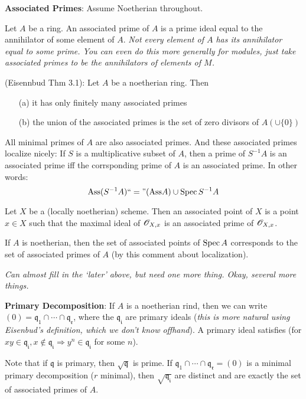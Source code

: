 \textbf{Associated Primes}: Assume Noetherian throughout.
\begin{definition} Let $A$ be a ring. An associated prime of $A$
is a prime ideal equal to the annihilator of some element of $A$.
\emph{Not every element of $A$ has its annihilator equal to some
prime. You can even do this more generally for modules, just take
associated primes to be the annihilators of elements of $M$.}
\end{definition} \begin{theorem}(Eisennbud Thm 3.1): Let $A$ be a
noetherian ring. Then \begin{itemize} \item[(a)] it has only
finitely many associated primes \item[(b)] the union of the
associated primes is the set of zero divisors of $A (\cup \{0\})$
\end{itemize} \end{theorem} \begin{remark} All minimal primes of
$A$ are also associated primes. And these associated primes
localize nicely: If $S$ is a multiplicative subset of $A$, then a
prime of $S^{-1}A$ is an associated prime iff the corrsponding
prime of $A$ is an associated prime. In other words: \[
\text{Ass}(S^{-1}A) ``=" (\text{Ass} A)\cup \text{\rm Spec\,}{S^{-1}A} \]
\end{remark} \begin{definition} Let $X$ be a (locally noetherian)
scheme. Then an associated point of $X$ is a point $x \in X$ such
that the maximal ideal of $\mathscr{O}_{X,x}$ is an associated prime of
$\mathscr{O}_{X,x}$.

If $A$ is noetherian, then the set of associated points of
$\text{\rm Spec\,}{A}$ corresponds to the set of associated primes of $A$ (by
this comment about localization). \end{definition}

\emph{Can almost fill in the `later' above, but need one more
thing.
Okay, several more things.}\\

\begin{proposition}\textbf{Primary Decomposition}: If $A$ is a
noetherian rind, then we can write $(0) = \mathfrak{q_1} \cap
\cdots \cap \mathfrak{q_r}$, where the $\mathfrak{q_i}$ are
primary ideals (\emph{this is more natural using Eisenbud's
definition, which we don't know offhand}). A primary ideal
satisfies (for $xy \in \mathfrak{q_i}, x \not \in \mathfrak{q_i}
\Rightarrow y^n \in \mathfrak{q_i}$ for some $n$).
\end{proposition} \begin{remark} Note that if $\mathfrak{q}$ is
primary, then $\sqrt{\mathfrak{q}}$ is prime. If $\mathfrak{q_1}
\cap \cdots \cap \mathfrak{q_r} = (0)$ is a minimal primary
decomposition ($r$ minimal), then $\sqrt{\mathfrak{q_i}}$ are
distinct and are exactly the set of associated primes of $A$.
\end{remark}


